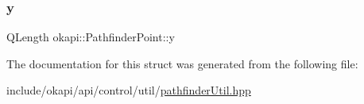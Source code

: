 \mbox{\label{structokapi_1_1PathfinderPoint_ad6709f91b4117b390ce82247d35f70ca}} 
\subsubsection{\texorpdfstring{y}{y}}
{\footnotesize\ttfamily Q\+Length okapi\+::\+Pathfinder\+Point\+::y}



The documentation for this struct was generated from the following file\+:\begin{DoxyCompactItemize}
\item 
include/okapi/api/control/util/\mbox{\hyperlink{pathfinderUtil_8hpp}{pathfinder\+Util.\+hpp}}\end{DoxyCompactItemize}
